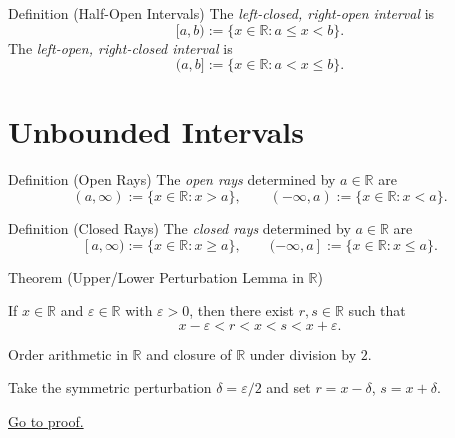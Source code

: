 \begin{definitionbox}{Definition (Half-Open Intervals)}
The \emph{left-closed, right-open interval} is
\[
[a,b) := \{ x \in \mathbb{R} : a \le x < b \}.
\]
The \emph{left-open, right-closed interval} is
\[
(a,b] := \{ x \in \mathbb{R} : a < x \le b \}.
\]
\end{definitionbox}

\section*{Unbounded Intervals}

\begin{definitionbox}{Definition (Open Rays)}
The \emph{open rays} determined by $a \in \mathbb{R}$ are
\[
(a,\infty) := \{ x \in \mathbb{R} : x > a \},
\qquad
(-\infty,a) := \{ x \in \mathbb{R} : x < a \}.
\]
\end{definitionbox}

\begin{definitionbox}{Definition (Closed Rays)}
The \emph{closed rays} determined by $a \in \mathbb{R}$ are
\[
[a,\infty) := \{ x \in \mathbb{R} : x \ge a \},
\qquad
(-\infty,a] := \{ x \in \mathbb{R} : x \le a \}.
\]
\end{definitionbox}

\begin{theorembox}{Theorem (Upper/Lower Perturbation Lemma in $\mathbb{R}$)}
\begin{theorem}
\label{thm:real-upper-lower-perturbation}
If $x\in\mathbb{R}$ and $\varepsilon\in\mathbb{R}$ with $\varepsilon>0$, then
there exist $r,s\in\mathbb{R}$ such that
\[
x-\varepsilon<r<x<s<x+\varepsilon.
\]
\end{theorem}
\end{theorembox}

\begin{remark*}[Dependencies]
Order arithmetic in $\mathbb{R}$ and closure of $\mathbb{R}$ under division by
$2$.
\end{remark*}

\begin{remark*}
Take the symmetric perturbation $\delta=\varepsilon/2$ and set
$r=x-\delta$, $s=x+\delta$.
\end{remark*}

\begin{remark*}[Proof]
\hyperref[prf:real-upper-lower-perturbation]{Go to proof.}
\end{remark*}

